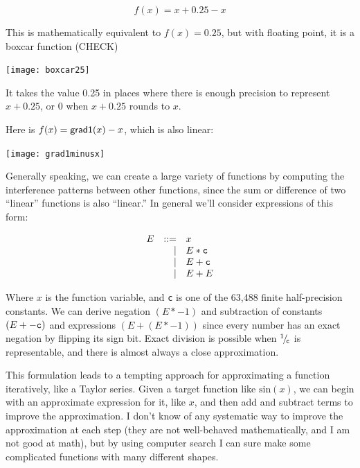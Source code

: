\documentclass[twocolumn]{article}
\newcommand\sfrac[2]{\!{}\,^{#1}\!/{}\!_{#2}}
\begin{document}

$$f(x) = x + 0.25 - x$$

This is mathematically equivalent to $f(x) = 0.25$, but with floating point, it
is a boxcar function (CHECK)

\begin{center}
\texttt{[image: boxcar25]}
\end{center}

It takes the value 0.25 in places where there is enough precision to
represent $x + 0.25$, or 0 when $x + 0.25$ rounds to $x$.

Here is $f(x) = {\sf grad1}(x) - x$, which is also linear:
\begin{center}
\texttt{[image: grad1minusx]}
\end{center}

Generally speaking, we can create a large variety of functions by
computing the interference patterns between other functions, since the
sum or difference of two ``linear'' functions is also ``linear.'' In
general we'll consider expressions of this form:

\[
\begin{array}{rrl}
E & ::= & x              \\
  &  |  & E * {\tt c}    \\
  &  |  & E + {\tt c}    \\
  &  |  & E + E          \\
\end{array}
\]

Where $x$ is the function variable, and {\tt c} is one of the 63,488
finite half-precision constants. We can derive negation $(E * -1)$ and
subtraction of constants $(E + -{\tt c})$ and expressions $(E + (E *
-1))$ since every number has an exact negation by flipping its sign
bit. Exact division is possible when $\sfrac{1}{{\tt c}}$ is
representable, and there is almost always a close approximation.

This formulation leads to a tempting approach for approximating a
function iteratively, like a Taylor series. Given a target function
like $\mathrm{sin}(x)$, we can begin with an approximate expression for it,
like $x$, and then add and subtract terms to improve the
approximation. I don't know of any systematic way to improve the
approximation at each step (they are not well-behaved mathematically,
and I am not good at math), but by using computer search I can sure
make some complicated functions with many different shapes.
\end{document}
